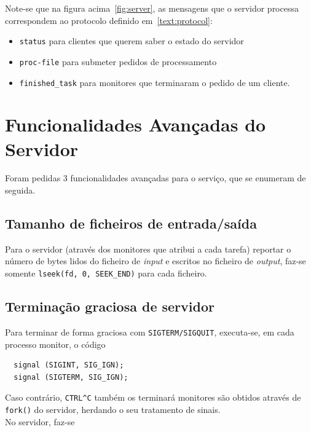 \documentclass[11pt,a4paper]{report}%
\begin{document}
Note-se que na figura acima~\ref{fig:server}, as mensagens que o servidor processa
correspondem ao protocolo definido em~\ref{text:protocol}:
\begin{itemize}
  \item \lstinline{status} para clientes que querem saber o estado do servidor
  \item \lstinline{proc-file} para submeter pedidos de processamento
  \item \lstinline{finished_task} para monitores que terminaram o pedido de um cliente.
\end{itemize}

\section{Funcionalidades Avançadas do Servidor}

Foram pedidas 3 funcionalidades avançadas para o serviço, que se enumeram de seguida.

\subsection{Tamanho de ficheiros de entrada/saída}
Para o servidor (através dos monitores que atribui a cada tarefa) reportar
o número de bytes lidos do ficheiro de \textit{input} e escritos no ficheiro de \textit{output},
faz-se somente \lstinline{lseek(fd, 0, SEEK_END)} para cada ficheiro.

\subsection{Terminação graciosa de servidor}
Para terminar de forma graciosa com \lstinline{SIGTERM/SIGQUIT}, executa-se, em cada processo monitor,
o código

\begin{lstlisting}
  signal (SIGINT, SIG_IGN);
  signal (SIGTERM, SIG_IGN);
\end{lstlisting}

Caso contrário, \lstinline{CTRL^C} também os terminará \textemdash monitores são obtidos através de
\lstinline{fork()} do servidor, herdando o seu tratamento de sinais.\\

No servidor, faz-se

\end{document}
